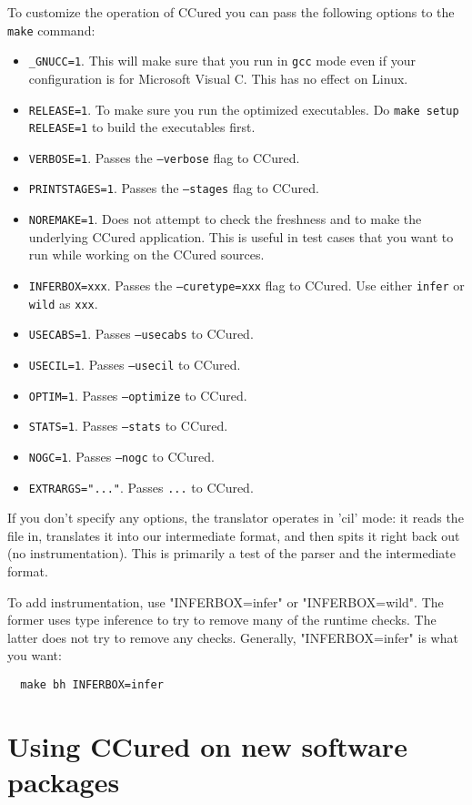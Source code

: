 \documentclass{book}
\def\t#1{{\tt #1}}
\begin{document}
 To customize the operation of CCured you can pass the following options to
the \t{make} command:
\begin{itemize}
\item \t{\_GNUCC=1}. This will make sure that you run in \t{gcc} mode even if
your configuration is for Microsoft Visual C. This has no effect on Linux.
\item \t{RELEASE=1}. To make sure you run the optimized executables. Do
\t{make setup RELEASE=1} to build the executables first.
\item \t{VERBOSE=1}. Passes the \t{--verbose} flag to CCured.
\item \t{PRINTSTAGES=1}. Passes the \t{--stages} flag to CCured.
\item \t{NOREMAKE=1}. Does not attempt to check the freshness and to make the
underlying CCured application. This is useful in test cases that you want to
run while working on the CCured sources.
\item \t{INFERBOX=xxx}. Passes the \t{--curetype=xxx} flag to CCured. Use
either \t{infer} or \t{wild} as \t{xxx}.
\item \t{USECABS=1}. Passes \t{--usecabs} to CCured.
\item \t{USECIL=1}. Passes \t{--usecil} to CCured.
\item \t{OPTIM=1}. Passes \t{--optimize} to CCured.
\item \t{STATS=1}. Passes \t{--stats} to CCured.
\item \t{NOGC=1}. Passes \t{--nogc} to CCured.
\item \t{EXTRARGS="..."}. Passes \t{...} to CCured.
\end{itemize}

 If you don't specify any options, the translator operates in 'cil' mode:
it reads the file in, translates it into our intermediate format, and
then spits it right back out (no instrumentation).  This is primarily a
test of the parser and the intermediate format.

To add instrumentation, use "INFERBOX=infer" or "INFERBOX=wild".  The former
uses type inference to try to remove many of the runtime checks.  The
latter does not try to remove any checks.  Generally, "INFERBOX=infer" is
what you want:

\begin{verbatim}
  make bh INFERBOX=infer
\end{verbatim}


\chapter{Using CCured on new software packages}
\end{document}
